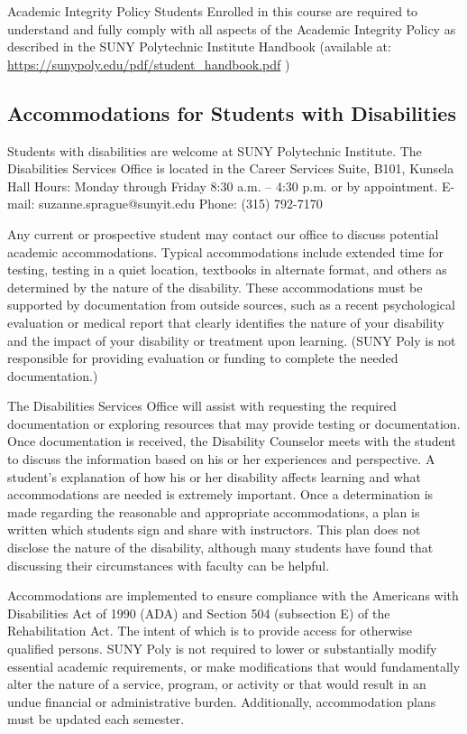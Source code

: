 \documentclass[11pt]{article}
\begin{document}
Academic Integrity Policy Students Enrolled in this course are required to understand and fully comply with all aspects of the Academic Integrity Policy as described in the SUNY Polytechnic Institute Handbook (available at:  \url{https://sunypoly.edu/pdf/student\_handbook.pdf} )

\subsection{Accommodations for Students with Disabilities}
\label{sec:org043c9dd}

Students with disabilities are welcome at SUNY Polytechnic Institute.
The Disabilities Services Office is located in the Career Services Suite, B101, Kunsela Hall
Hours: Monday through Friday 8:30 a.m. – 4:30 p.m. or by appointment.
E-mail: suzanne.sprague@sunyit.edu
Phone: (315) 792-7170

Any current or prospective student may contact our office to discuss potential academic accommodations. Typical accommodations include extended time for testing, testing in a quiet location, textbooks in alternate format, and others as determined by the nature of the disability. These accommodations must be supported by documentation from outside sources, such as a recent psychological evaluation or medical report that clearly identifies the nature of your disability and the impact of your disability or treatment upon learning. (SUNY Poly is not responsible for providing evaluation or funding to complete the needed documentation.)

The Disabilities Services Office will assist with requesting the required documentation or exploring resources that may provide testing or documentation. Once documentation is received, the Disability Counselor meets with the student to discuss the information based on his or her experiences and perspective. A student’s explanation of how his or her disability affects learning and what accommodations are needed is extremely important. Once a determination is made regarding the reasonable and appropriate accommodations, a plan is written which students sign and share with instructors. This plan does not disclose the nature of the disability, although many students have found that discussing their circumstances with faculty can be helpful.

Accommodations are implemented to ensure compliance with the Americans with Disabilities Act of 1990 (ADA) and Section 504 (subsection E) of the Rehabilitation Act. The intent of which is to provide access for otherwise qualified persons. SUNY Poly is not required to lower or substantially modify essential academic requirements, or make modifications that would fundamentally alter the nature of a service, program, or activity or that would result in an undue financial or administrative burden. Additionally, accommodation plans must be updated each semester.
\end{document}

